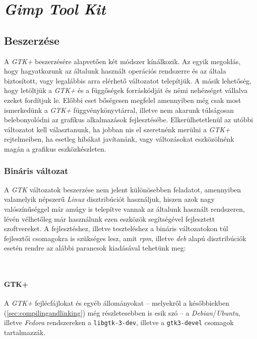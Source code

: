 \section{\textit{Gimp Tool Kit}}

\subsection{Beszerzése}

A \textit{GTK+} beszerzésére alapvetően két módszer kínálkozik. Az egyik megoldás, hogy hagyatkozunk az általunk használt operációs rendszerre és az általa biztosított, vagy legalábbis arra elérhető változatot telepítjük. A másik lehetőség, hogy letöltjük a \textit{GTK+} és a függőségek forráskódját és némi nehézséget vállalva ezeket fordítjuk le. Előbbi eset bőségesen megfelel amennyiben még csak most ismerkedünk a \textit{GTK+} függvénykönyvtárral, illetve nem akarunk túlságosan belebonyolódni az grafikus alkalmazások fejlesztésébe. Elkerülhetetlenül az utóbbi változatot kell választanunk, ha jobban nis el szeretnénk merülni a \textit{GTK+} rejtelmeiben, ha esetleg hibákat javítanánk, vagy változásokat eszközölnénk magán a grafikus eszközkészleten.

\subsubsection{Bináris változat}

A \textit{GTK} változatok beszerzése nem jelent különösebben feladatot, amennyiben valamelyik népszerű \textit{Linux} disztribúciót használjuk, hiszen azok nagy valószínűséggel már amúgy is telepítve vannak az általunk használt rendszeren, lévén vélhetőleg már használunk ezen eszközök segítségével fejlesztett szoftvereket. A fejlesztéshez, illetve teszteléshez a bináris változatokon túl fejlesztői csomagokra is szükséges lesz, amit \textit{rpm}, illetve \textit{deb} alapú disztribúciók esetén rendre az alábbi parancsok kiadásával tehetünk meg:

\\

\paragraph{GTK+}

A \textit{GTK+} fejlécfájlokat és egyéb állományokat -- melyekről a későbbiekben (\ref{sec:compilingandlinking}) még részletesebben is esik szó -- a \textit{Debian}/\textit{Ubuntu}, illetve \textit{Fedora} rendszereken a \texttt{libgtk-3-dev}, illetve a \texttt{gtk3-devel} csomagok tartalmazzák.

